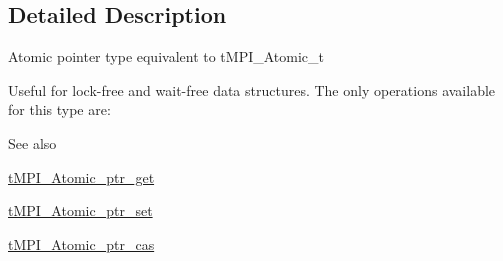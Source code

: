 \subsection{\-Detailed \-Description}
\-Atomic pointer type equivalent to t\-M\-P\-I\-\_\-\-Atomic\-\_\-t

\-Useful for lock-\/free and wait-\/free data structures. \-The only operations available for this type are\-: \begin{DoxySeeAlso}{\-See also}

\begin{DoxyItemize}
\item \hyperlink{share_2template_2gromacs_2thread__mpi_2atomic_8h_a0769c59b89bb5ff489110f9de52658cf}{t\-M\-P\-I\-\_\-\-Atomic\-\_\-ptr\-\_\-get}
\item \hyperlink{share_2template_2gromacs_2thread__mpi_2atomic_8h_a4a33bfcb81731d031d1b24e8d781f1eb}{t\-M\-P\-I\-\_\-\-Atomic\-\_\-ptr\-\_\-set}
\item \hyperlink{share_2template_2gromacs_2thread__mpi_2atomic_8h_ae551c907723789ef6916cc1e9c574849}{t\-M\-P\-I\-\_\-\-Atomic\-\_\-ptr\-\_\-cas} 
\end{DoxyItemize}
\end{DoxySeeAlso}


